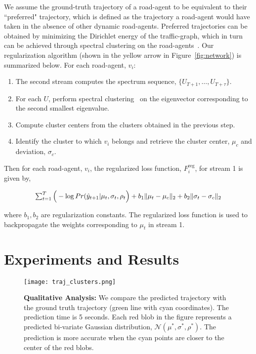\documentclass[10pt,twocolumn,letterpaper]{article}
\newcommand{\Vts}[1]{\lVert #1 \rVert}
\theoremstyle{plain}
\begin{document}
We assume the ground-truth trajectory of a road-agent to be equivalent to their ``preferred" trajectory, which is defined as the trajectory a road-agent would have taken in the absence of other dynamic road-agents.  Preferred trajectories can be obtained by minimizing the Dirichlet energy of the traffic-graph, which in turn can be achieved through spectral clustering on the road-agents~\cite{dirichlet}. Our regularization algorithm (shown in the yellow arrow in Figure~\ref{fig:network}) is summarized below. For each road-agent, $v_i$: 

\begin{enumerate}[noitemsep]
    \item The second stream computes the spectrum sequence, $\{U_{T+1}, \ldots, U_{T+\tau}\}$.
    \item For each $U$, perform spectral clustering~\cite{von2007tutorial} on the eigenvector corresponding to the second smallest eigenvalue.
    \item Compute cluster centers from the clusters obtained in the previous step.
    \item Identify the cluster to which $v_i$ belongs and retrieve the cluster center, $\mu_c$ and deviation, $\sigma_c$. 
\end{enumerate}
Then for each road-agent, $v_i$, the regularized loss function, $F^{\textrm{reg}}_i$, for stream 1 is given by,

\begin{equation}
\resizebox{.8\columnwidth}{!}{
    $\sum_{t=1}^T \Big (- \log Pr(\hat y_{t+1} | \mu_t, \sigma_t, \rho_t \Big ) + b_1\Vts{\mu_t - \mu_c}_2 + b_2\Vts{\sigma_t - \sigma_c}_2$
    }
    \label{eq: oregularized_loss}
\end{equation}

\noindent where $b_1, b_2$ are regularization constants. The regularized loss function is used to backpropagate the weights corresponding to $\mu_t$ in stream 1.


 
\section{Experiments and Results}

\begin{figure*}[h]
    \centering
    \texttt{[image: traj\_clusters.png]}
    \caption{\textbf{Qualitative Analysis:} We compare the predicted trajectory with the ground truth trajectory (green line with cyan coordinates). The prediction time is 5 seconds. Each red blob in the figure represents a predicted bi-variate Gaussian distribution, $\mathcal{N}(\mu^{*}, \sigma^{*}, \rho^{*})$. The prediction is more accurate when the cyan points are closer to the center of the red blobs. }
    \label{fig: qual}
    \vspace{-10pt}
\end{figure*}
\end{document}
